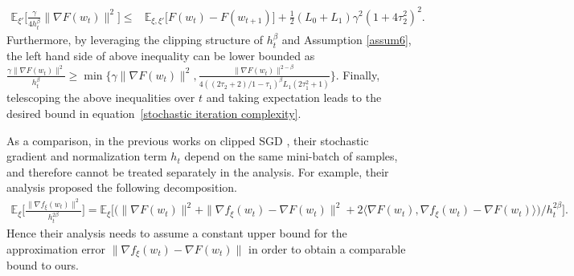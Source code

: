 \documentclass[10pt]{article} %
\def\eqref#1{equation~\ref{#1}}
\begin{document}
\begin{align}
   \mathbb{E}_{\xi'}\big[\frac{\gamma}{4h_t^{\beta}} \big \|\nabla F(w_t) \big \|^2\big]  \leq& \mathbb{E}_{\xi,\xi'}\big[F(w_t) - F(w_{t+1})\big] + \frac{1}{2}(L_0+L_1 )\gamma^2(1+4\tau_2^2)^2.
    \nonumber 
\end{align}
Furthermore, by leveraging the clipping structure of $h_t^{\beta}$ and Assumption \ref{assum6}, the left hand side of above inequality can be lower bounded as 
$\frac{\gamma\| \nabla F(w_t) \|^2}{h_t^{\beta}} \geq \min \{\gamma \|\nabla F(w_t) \|^2, \frac{\|\nabla F(w_t) \|^{2-\beta}}{4((2\tau_2+2)/1-\tau_1)^{\beta}L_1(2\tau_1^2+1)}\}.$
Finally, telescoping the above inequalities over $t$ and taking expectation leads to the desired bound in \eqref{stochastic iteration complexity}. 

As a comparison, in the previous works on clipped SGD \citep{zhang2020gradientclippingacceleratestraining,genralclip}, their stochastic gradient and normalization term $h_t$ depend on the same mini-batch of samples, and therefore cannot be treated separately in the analysis. For example, their analysis proposed the following decomposition.
\begin{align}
    \mathbb{E}_{\xi} \Big[\frac{\|\nabla f_{\xi}(w_t)\|^2 }{h_t^{2\beta}}\Big] =\mathbb{E}_{\xi}\Big[\Big(\| \nabla F(w_t)\|^2+\|\nabla f_{\xi}(w_t)- \nabla F(w_t) \|^2 +2\langle\nabla F(w_t), \nabla f_{\xi}(w_t)-\nabla F(w_t) \rangle\Big)/{h_t^{2\beta}}\Big]. \nonumber 
\end{align}
Hence their analysis needs to assume a constant upper bound for the approximation error $\| \nabla f_{\xi}(w_t)-\nabla F(w_t)\| $ in order to obtain a comparable bound to ours.
\end{document}
